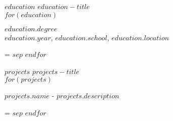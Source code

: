 \documentclass[11pt,a4paper]{article}
\newcommand{\spaceXL} {\vspace{20pt}}
\newcommand{\spaceM} {\vspace{8pt}}
\newcommand{\spaceS} {\vspace{4pt}}
\newcommand{\sectionTitle}[1]{\textcolor{secondaryColor}{\uppercase{\small{#1}}}}
\newcommand{\contentTitle}[1] {\MakeUppercase\normalsize\textbf{#1}}
\newcommand{\contentSubTitle}[1] {\normalsize\textcolor{secondaryColor}{#1}}
\newcommand{\content}[1] {\normalsize{#1}}
\newenvironment{absolutelynopagebreak}
  {\par\nobreak\vfil\penalty0\vfilneg
   \vtop\bgroup}
  {\par\xdef\tpd{\the\prevdepth}\egroup
   \prevdepth=\tpd}
\def \ifNotEmpty#1{\def\temp{#1} \ifx\temp\empty \else}
\begin{document}
\ifNotEmpty{$education$}
  \spaceXL
  \sectionTitle{$education-title$} \\

  \spaceM
  $for(education)$
    \begin{absolutelynopagebreak}
      \contentTitle{$education.degree$} \\
      \contentSubTitle{$education.year$, $education.school$, $education.location$} \\
    \end{absolutelynopagebreak}
    $sep$\spaceS
  $endfor$
\fi

\ifNotEmpty{$projects$}
  \spaceXL
  \sectionTitle{$projects-title$} \\

  \spaceM
  $for(projects)$
    \begin{absolutelynopagebreak}
      \contentTitle{$projects.name$} - \content{$projects.description$}\\
    \end{absolutelynopagebreak}
    $sep$\spaceS
  $endfor$
\fi
\end{document}
